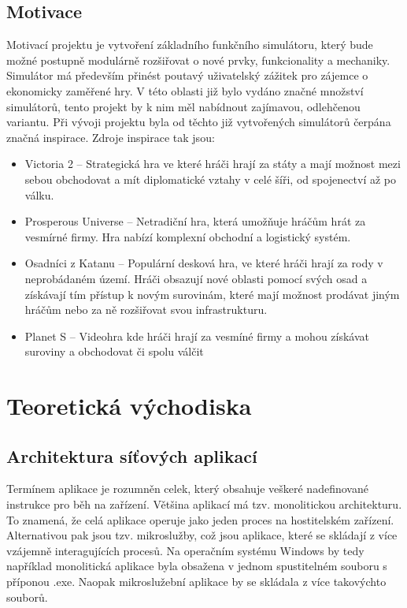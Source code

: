 \documentclass[FM,BP]{tulthesis}
\begin{document}
\section{Motivace}
Motivací projektu je vytvoření základního funkčního simulátoru, který bude možné postupně modulárně rozšiřovat o nové prvky, funkcionality a mechaniky. Simulátor má především přinést poutavý uživatelský zážitek pro zájemce o ekonomicky zaměřené hry. V této oblasti již bylo vydáno značné množství simulátorů, tento projekt by k nim měl nabídnout zajímavou, odlehčenou variantu. Při vývoji projektu byla od těchto již vytvořených simulátorů čerpána značná inspirace.
Zdroje inspirace tak jsou:
\begin{itemize}
	\item Victoria 2 -- Strategická hra ve které hráči hrají za státy a mají možnost mezi sebou obchodovat a mít diplomatické vztahy v celé šíři, od spojenectví až po válku.
	\item Prosperous Universe -- Netradiční hra, která umožňuje hráčům hrát za vesmírné firmy. Hra nabízí komplexní obchodní a logistický systém.
	\item Osadníci z Katanu -- Populární desková hra, ve které hráči hrají za rody v neprobádaném území. Hráči obsazují nové oblasti pomocí svých osad a získávají tím přístup k novým surovinám, které mají možnost prodávat jiným hráčům nebo za ně rozšiřovat svou infrastrukturu.
	\item Planet S -- Videohra kde hráči hrají za vesmíné firmy a mohou získávat suroviny a obchodovat či spolu válčit
\end{itemize}

\chapter{Teoretická východiska}
\section{Architektura síťových aplikací}
Termínem aplikace je rozumněn celek, který obsahuje veškeré nadefinované instrukce pro běh na zařízení. Většina aplikací má tzv. monolitickou architekturu. To znamená, že celá aplikace operuje jako jeden proces na hostitelském zařízení. Alternativou pak jsou tzv. mikroslužby, což jsou aplikace, které se skládají z více vzájemně interagujících procesů\cite{microsluzby}. Na operačním systému Windows by tedy například monolitická aplikace byla obsažena v jednom spustitelném souboru s příponou .exe. Naopak mikroslužební aplikace by se skládala z více takovýchto souborů.
\end{document}
